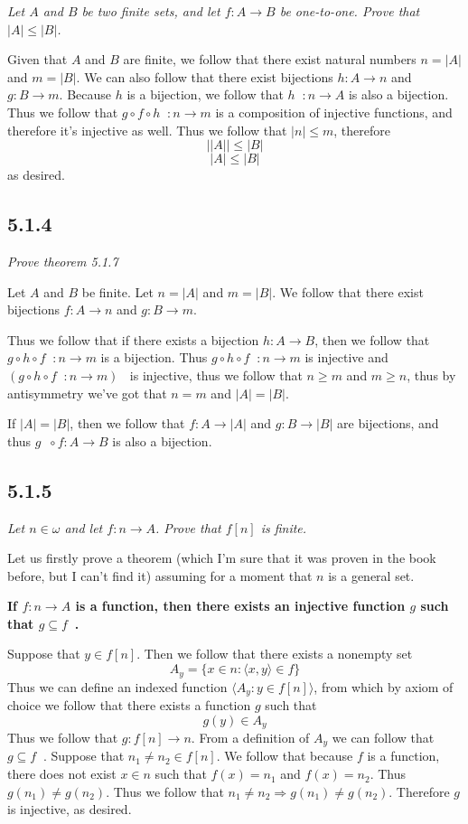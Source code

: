 \documentclass[11pt,oneside,titlepage]{book}
\DeclareMathOperator \inv {^{-1}}
\DeclareMathOperator \ra {\Rightarrow}
\newcommand{\eangle}[1]{\langle #1 \rangle}
\begin{document}
\textit{Let $A$ and $B$ be two finite sets, and let $f: A \to B$ be one-to-one. Prove
  that $|A| \leq |B|$. }

Given that $A$ and $B$ are finite, we follow that there exist natural numbers $n = |A|$ and
$m = |B|$. We can also follow that there exist bijections $h: A \to n$ and $g: B \to m$.
Because $h$ is a bijection, we follow that $h \inv: n \to A$ is also a bijection.
Thus we follow that $g \circ f \circ h \inv: n \to m $ is a composition of injective functions,
and therefore it's injective as well. Thus we follow that $|n| \leq m$, therefore
$$||A|| \leq |B|$$
$$|A| \leq |B|$$
as desired.

\subsection*{5.1.4}

\textit{Prove theorem 5.1.7 }

Let $A$ and $B$ be finite. Let $n = |A|$ and $m = |B|$. We follow that there exist bijections
$f: A \to n$ and $g: B \to m$.

Thus we follow that if there exists a bijection $h: A \to B$,
then we follow that $g \circ h \circ f \inv: n \to m$ is a bijection. Thus
$g \circ h \circ f \inv: n \to m$ is injective and
$(g \circ h \circ f \inv: n \to m)\inv$ is injective, thus we follow that $n \geq m$ and
$m \geq n$, thus by antisymmetry we've got that $n = m$ and $|A| = |B|$.

If $|A| = |B|$, then we follow that $f: A \to |A|$ and $g: B \to |B|$ are bijections,
and thus $g \inv \circ f: A \to B$ is also a bijection.

\subsection*{5.1.5}

\textit{Let $n \in \omega$ and let $f: n \to A$. Prove that $f[n]$ is finite.}

Let us firstly prove a theorem (which I'm sure that it was proven in the book before,
but I can't find it) assuming for a moment that $n$ is a general set.

\textbf{If $f: n \to A$ is a function, then there exists an injective function $g$
such that $g \subseteq f\inv$.}

Suppose that $y \in f[n]$. Then we follow that there exists a nonempty set
$$A_y = \{x \in n : \eangle{x, y} \in f\}$$
Thus we can define an indexed function $\eangle{A_y: y \in f[n]}$, from which by axiom of
choice we follow that there exists a function $g$ such that 
$$g(y) \in A_y$$
Thus we follow that $g: f[n] \to n$. From a definition of $A_y$ we can follow that
$g \subseteq f\inv$. Suppose that $n_1 \neq n_2 \in f[n]$. We follow that because $f$ is a
function, there does not exist $x \in n$ such that $f(x) = n_1$ and $f(x) = n_2$. Thus
$g(n_1) \neq g(n_2)$.
Thus we follow that $n_1 \neq n_2 \ra g(n_1) \neq g(n_2)$. Therefore $g$ is injective, as desired.
\end{document}
